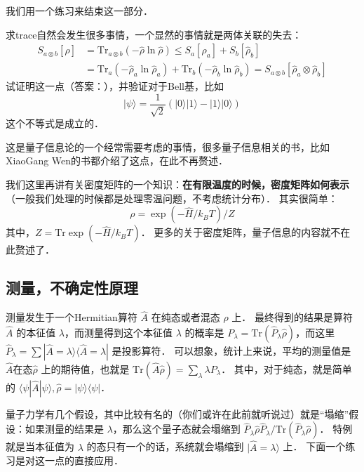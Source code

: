 我们用一个练习来结束这一部分．
\begin{exercise}{}
求trace自然会发生很多事情，一个显然的事情就是两体关联的失去：
\begin{equation}
\begin{split}
S_{a\otimes b}[\hat\rho]&=\text{Tr}_{a\otimes b}(-\hat\rho\ln\hat\rho)\le S_a[\hat\rho_a]+S_b[\hat\rho_b]\\
&=\text{Tr}_a(-\hat\rho_a\ln\hat\rho_a)+\text{Tr}_b(-\hat\rho_b\ln\hat\rho_b)=S_{a\otimes b}[\hat\rho_a\otimes\hat\rho_b]
\end{split}
\end{equation}
试证明这一点（答案：\cite{trace}），并验证对于Bell基，比如
\begin{equation}
|\psi\rangle = \frac{1}{\sqrt{2}}(|0\rangle|1\rangle-|1\rangle|0\rangle)
\end{equation}
这个不等式是成立的．

这是量子信息论的一个经常需要考虑的事情，很多量子信息相关的书，比如XiaoGang Wen的书\cite{2015arXiv150802595Z}都介绍了这点，在此不再赘述．
\end{exercise}

我们这里再讲有关密度矩阵的一个知识：\textbf{在有限温度的时候，密度矩阵如何表示}（一般我们处理的时候都是处理零温问题，不考虑统计分布）． 其实很简单：
\begin{equation}
\rho=\exp(-\hat{H}/k_BT)/Z
\end{equation}
其中，$Z=\text{Tr}\exp(-\hat{H}/k_BT)$． 更多的关于密度矩阵，量子信息的内容就不在此赘述了．


\subsection{测量，不确定性原理}

测量发生于一个Hermitian算符 $\hat A$ 在纯态或者混态 $\hat\rho$ 上． 最终得到的结果是算符 $\hat A$ 的本征值 $\lambda$，而测量得到这个本征值 $\lambda$ 的概率是 $P_\lambda=\text{Tr}(\hat{P}_\lambda\hat\rho)$，而这里 $\hat P_\lambda=\sum|\hat{A}=\lambda\rangle\langle\hat{A}=\lambda|$ 是投影算符． 可以想象，统计上来说，平均的测量值是 $\hat A$在态$\hat\rho$ 上的期待值，也就是 $\text{Tr}(\hat A\hat\rho)=\sum_\lambda \lambda P_\lambda$． 其中，对于纯态，就是简单的 $\langle\psi|\hat A|\psi\rangle, \hat\rho=|\psi\rangle\langle\psi|$．

量子力学有几个假设，其中比较有名的（你们或许在此前就听说过）就是``塌缩''假设：如果测量的结果是 $\lambda$，那么这个量子态就会塌缩到 ${\hat P_\lambda\hat\rho\hat P_\lambda}/{\text{Tr}(\hat P_\lambda\hat\rho)}$． 特例就是当本征值为 $\lambda$ 的态只有一个的话，系统就会塌缩到 $|\hat{A}=\lambda\rangle$ 上． 下面一个练习是对这一点的直接应用．

